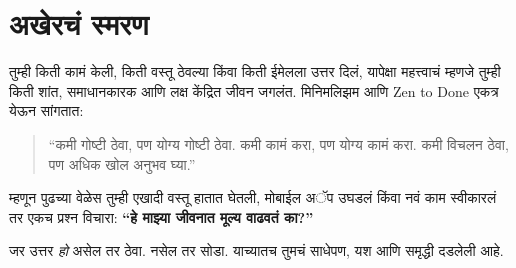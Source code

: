 \section*{अखेरचं स्मरण}

तुम्ही किती कामं केली, किती वस्तू ठेवल्या किंवा किती ईमेलला उत्तर दिलं, यापेक्षा महत्त्वाचं म्हणजे तुम्ही किती शांत, समाधानकारक आणि लक्ष केंद्रित जीवन जगलंत. मिनिमलिझम आणि Zen to Done एकत्र येऊन सांगतात:  

\begin{quote}
“कमी गोष्टी ठेवा, पण योग्य गोष्टी ठेवा.  
कमी कामं करा, पण योग्य कामं करा.  
कमी विचलन ठेवा, पण अधिक खोल अनुभव घ्या.”  
\end{quote}

म्हणून पुढच्या वेळेस तुम्ही एखादी वस्तू हातात घेतली, मोबाईल अॅप उघडलं किंवा नवं काम स्वीकारलं तर एकच प्रश्न विचारा:  
\textbf{“हे माझ्या जीवनात मूल्य वाढवतं का?”}  

जर उत्तर \textit{हो} असेल तर ठेवा. नसेल तर सोडा.  
याच्यातच तुमचं साधेपण, यश आणि समृद्धी दडलेली आहे.  
